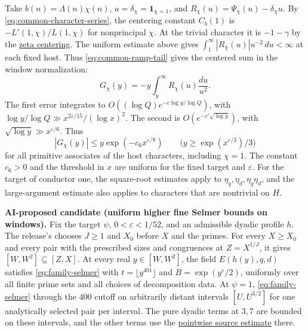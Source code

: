 Take \(b(n)=\Lambda(n)\chi(n)\), \(a=\delta_\chi=\mathbf1_{\chi=1}\),
and \(R_\chi(u)=\Psi_\chi(u)-\delta_\chi u\).
By \eqref{eq:common-character-series}, the centering constant
\(C_b(1)\) is \(-L'(1,\chi)/L(1,\chi)\) for nonprincipal \(\chi\).
At the trivial character it is \(-1-\gamma\) by the
\hyperlink{proof.centered-mellin-residues}{zeta centering}.
The uniform estimate above gives \(\int_1^\infty |R_\chi(u)|u^{-2}\,du<\infty\)
at each fixed host. Thus \eqref{eq:common-ramp-tail} gives the
centered sum in the window normalization:
\[
  G_\chi(y)=-y\int_y^\infty R_\chi(u)\frac{du}{u^2}.
\]
The first error integrates to \(O((\log Q)e^{-c\log y/\log Q})\), with
\(\log y/\log Q\gg x^{2\varepsilon/15}/(\log x)^2\). The second is
\(O(e^{-c'\sqrt{\log y}})\), with \(\sqrt{\log y}\gg x^{\varepsilon/6}\).
Thus
\begin{equation}
\label{eq:host-character-tail}
  |G_\chi(y)|\le y\exp(-c_6x^{\varepsilon/8})
  \qquad\bigl(y\ge \exp(x^{\varepsilon/3})/3\bigr)
\end{equation}
for all primitive associates of the host characters, including \(\chi=1\).
The constant \(c_6>0\) and the threshold in \(x\) are uniform for the
fixed target and \(\varepsilon\). For the target of conductor one, the
square-root estimates apply to \(\eta_q,\eta_d,\eta_q\eta_d\), and the
large-argument estimate also applies to characters that are
nontrivial on \(H\).

%
\textbf{AI-proposed candidate (uniform higher fine Selmer bounds on
windows).}
Fix the target \(\psi\), \(0<\varepsilon<1/52\), and an admissible
dyadic profile \(h\). The release's
chooses \(J\ge1\) and \(X_0\) before \(X\) and the primes.
For every \(X\ge X_0\) and every pair with the prescribed sizes and
congruences at \(Z=X^{1/J}\), it gives \([W,W^2]\subseteq[Z,X]\).
At every real \(y\in[W,W^2]\), the field \(E(h(y),q,d)\) satisfies
\eqref{eq:family-selmer} with \(t=\lfloor y^{401}\rfloor\) and
\(B=\exp(y^\varepsilon/2)\), uniformly over all finite prime sets
and all choices of decomposition data.
{At \(\psi=1\), \eqref{eq:family-selmer} through the \(400\) cutoff
on arbitrarily distant intervals \([U,U^{3/2}]\) for one analytically
selected pair per interval. The pure dyadic terms at \(3,7\) are
bounded on these intervals, and the other terms use the
\hyperlink{proof.selmer-classical-residual}{pointwise source estimate}
there.}

